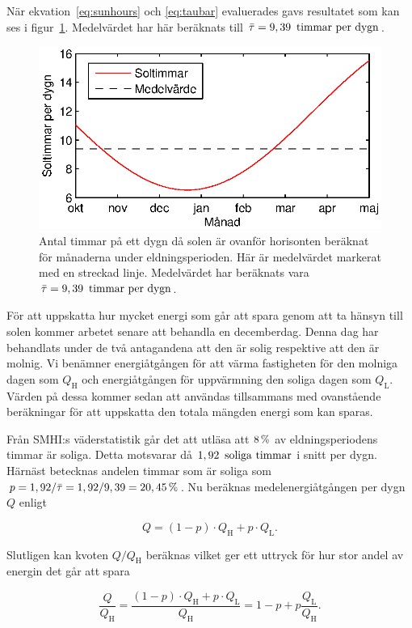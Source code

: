 När ekvation~\eqref{eq:sunhours} och \eqref{eq:taubar} evaluerades gavs 
resultatet som kan ses i figur~\ref{fig:sunhours}.
Medelvärdet har här beräknats till $\bar{\tau}=\unit[9,39]{~timmar~per~dygn}$.
\begin{figure}
\centering
\includegraphics{images/sunhours.eps}
\caption{Antal timmar på ett dygn då solen är ovanför horisonten beräknat för månaderna under eldningsperioden.
Här är medelvärdet markerat med en streckad linje. Medelvärdet har beräknats vara
$\bar{\tau}=\unit[9,39]{~timmar~per~dygn}$.}
\label{fig:sunhours}
\end{figure}

\noindent
För att uppskatta hur mycket energi som går att spara genom att ta hänsyn till solen kommer arbetet
senare att behandla en decemberdag. Denna dag har behandlats under de två antagandena att den är solig respektive att den är molnig. Vi benämner energiåtgången för att värma fastigheten för den molniga dagen som $Q_\text{H}$ och energiåtgången för uppvärmning den soliga dagen som 
$Q_\text{L}$. Värden på dessa kommer sedan att användas tillsammans med
ovanstående beräkningar för att uppskatta den totala mängden energi som kan sparas. 

Från SMHI:s väderstatistik går det att utläsa att $\unit[8]{\%}$ av eldningsperiodens timmar är soliga\cite{SMHIdata}.
Detta motsvarar då $\unit[1,92]{~soliga~timmar}$ i snitt per dygn. Härnäst betecknas andelen timmar som är soliga som
$p = 1,92/\bar{\tau} = 1,92/9,39 = \unit[20,45]{\%}$. Nu beräknas medelenergiåtgången per dygn $Q$ enligt

\begin{equation}
Q = (1-p)\cdot Q_\text{H} + p\cdot Q_\text{L}.
\end{equation}

Slutligen kan kvoten $Q/Q_\text{H}$ beräknas vilket ger ett uttryck för hur stor andel av energin det går att spara

\begin{equation}
\frac{Q}{Q_\text{H}} = \frac{(1-p)\cdot Q_\text{H} + p\cdot Q_\text{L}}{Q_\text{H}} = 1-p+p\frac{Q_\text{L}}{Q_\text{H}}.
\end{equation}
